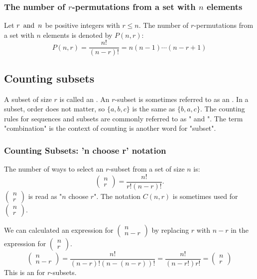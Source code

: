 \subsubsection*{The number of $r$-permutations from a set with $n$ elements}
Let $r \operatorname{~\text{and}~} n$ be positive integers with $r \leq n$. The number of $r$-permutations from a set with $n$ elements is denoted by $P(n,r)$:
\[
  P(n,r) = \frac{n!}{(n-r)!} = n(n-1)\cdots(n-r+1)
\]

\subsection{Counting subsets}
A subset of size $r$ is called an . An $r$-subset is sometimes referred to as an . In a subset, order does not matter, so $\{a,b,c\}$ is the same as $\{b,a,c\}$. The counting rules for sequences and subsets are commonly referred to as " and ". The term "combination" is the context of counting is another word for "subset".

\subsubsection*{Counting Subsets: 'n choose r' notation}
The number of ways to select an $r$-subset from a set of size $n$ is:
\[
  \begin{pmatrix}
    n \\ r
  \end{pmatrix} = \frac{n!}{r!(n-r)!}.
\]
$\begin{pmatrix}
    n \\ r
  \end{pmatrix}$ is read as "$n$ choose $r$". The notation $C(n,r)$ is sometimes used for $\begin{pmatrix}
    n \\ r
  \end{pmatrix}$.

We can calculated an expression for $\begin{pmatrix}
    n \\ n-r
  \end{pmatrix}$ by replacing $r$ with $n-r$ in the expression for $\begin{pmatrix}
    n \\ r
  \end{pmatrix}$.
\[
  \begin{pmatrix}
    n \\ n-r
  \end{pmatrix} = \frac{n!}{(n-r)!(n-(n-r))!} = \frac{n!}{(n-r!)r!} =
  \begin{pmatrix}
    n \\ r
  \end{pmatrix}
\]
This is an  for $r$-subsets.

